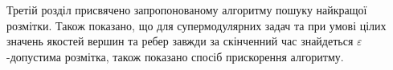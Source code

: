 Третій розділ присвячено запропонованому алгоритму пошуку найкращої розмітки. Також
показано, що для супермодулярних задач та при умові цілих значень якостей вершин та ребер
завжди за скінченний час знайдеться $\varepsilon$-допустима розмітка, також показано спосіб 
прискорення алгоритму.